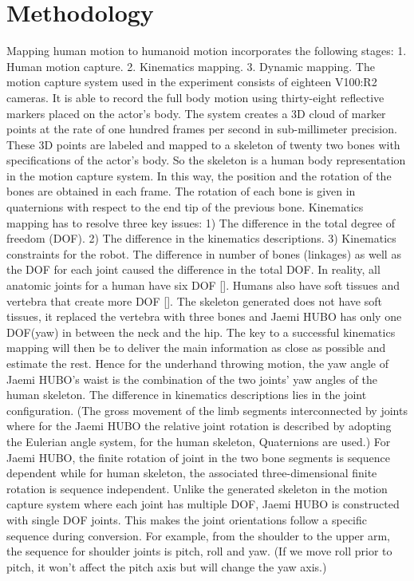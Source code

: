 \section{Methodology}

Mapping human motion to humanoid motion incorporates the following stages: 1. Human motion capture. 2. Kinematics mapping.   3. Dynamic mapping. 
The motion capture system used in the experiment consists of eighteen V100:R2 cameras. It is able to record the full body motion using thirty-eight reflective markers placed on the actor's body. The system creates a 3D cloud of marker points at the rate of one hundred frames per second in sub-millimeter precision. These 3D points are labeled and mapped to a skeleton of twenty two bones with specifications of the actor's body. So the skeleton is a human body representation in the motion capture system. In this way, the position and the rotation of the bones are obtained in each frame. The rotation of each bone is given in quaternions with respect to the end tip of the previous bone.
Kinematics mapping has to resolve three key issues: 
1)	The difference in the total degree of freedom (DOF). 
2)	The difference in the kinematics descriptions. 
3)	Kinematics constraints for the robot.
The difference in number of bones (linkages) as well as the DOF for each joint caused the difference in the total DOF. 
In reality, all anatomic joints for a human have six DOF []. Humans also have soft tissues and vertebra that create more DOF []. The skeleton generated does not have soft tissues, it replaced the vertebra with three bones and Jaemi HUBO has only one DOF(yaw) in between the neck and the hip. The key to a successful kinematics mapping will then be to deliver the main information as close as possible and estimate the rest. Hence for the underhand throwing motion, the yaw angle of Jaemi HUBO's waist is the combination of the two joints' yaw angles of the human skeleton. 
The difference in kinematics descriptions lies in the joint configuration. (The gross movement of the limb segments interconnected by joints where for the Jaemi HUBO the relative joint rotation is described by adopting the Eulerian angle system, for the human skeleton, Quaternions are used.) For Jaemi HUBO, the finite rotation of joint in the two bone segments is sequence dependent while for human skeleton, the associated three-dimensional finite rotation is sequence independent.
Unlike the generated skeleton in the motion capture system where each joint has multiple DOF, Jaemi HUBO is constructed with single DOF joints. This makes the joint orientations follow a specific sequence during conversion. For example, from the shoulder to the upper arm, the sequence for shoulder joints is pitch, roll and yaw. (If we move roll prior to pitch, it won't affect the pitch axis but will change the yaw axis.)


